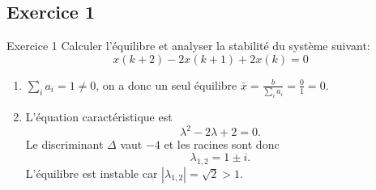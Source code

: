        \subsection{Exercice 1}
            \begin{exercise}{Exercice 1}
                Calculer l’équilibre et analyser la stabilité du système suivant:
                \begin{equation}
                    x(k+2)-2x(k+1)+2x(k) = 0
                \end{equation}
            \end{exercise}
            \begin{enumerate}
                \item $\sum_i a_i = 1 \neq 0$, on a donc un seul équilibre $\bar{x} = \frac{b}{\sum_i a_i} = \frac{0}{1} = 0$.
                \item L’équation caractéristique est
                \begin{equation}
                    \lambda^2-2\lambda+2 = 0.
                \end{equation}
                Le discriminant $\Delta$ vaut $-4$ et les racines sont donc
                \begin{equation}
                    \lambda_{1,2} = 1 \pm i.
                \end{equation}
                L’équilibre est instable car $|\lambda_{1,2}| = \sqrt{2} > 1$.
            \end{enumerate}
    
